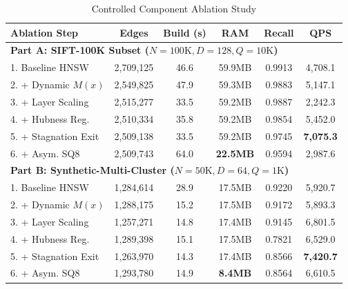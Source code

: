 \documentclass[conference,10pt]{IEEEtran}
\begin{document}
\begin{table}[htbp]
\caption{Controlled Component Ablation Study}
\centering
\begin{tabular}{lccccc}
\toprule
\textbf{Ablation Step} & \textbf{Edges} & \textbf{Build (s)} & \textbf{RAM} & \textbf{Recall} & \textbf{QPS} \\
\midrule
\multicolumn{6}{l}{\textbf{Part A: SIFT-100K Subset ($N=100\text{K}, D=128, Q=10\text{K}$)}} \\
1. Baseline HNSW & 2,709,125 & 46.6 & 59.9MB & 0.9913 & 4,708.1 \\
2. + Dynamic $M(x)$ & 2,549,825 & 47.9 & 59.3MB & 0.9883 & 5,147.1 \\
3. + Layer Scaling & 2,515,277 & 33.5 & 59.2MB & 0.9887 & 2,242.3 \\
4. + Hubness Reg. & 2,510,334 & 35.8 & 59.2MB & 0.9854 & 5,452.0 \\
5. + Stagnation Exit & 2,509,138 & 33.5 & 59.2MB & 0.9745 & \textbf{7,075.3} \\
6. + Asym. SQ8 & 2,509,743 & 64.0 & \textbf{22.5MB} & 0.9594 & 2,987.6 \\
\midrule
\multicolumn{6}{l}{\textbf{Part B: Synthetic-Multi-Cluster ($N=50\text{K}, D=64, Q=1\text{K}$)}} \\
1. Baseline HNSW & 1,284,614 & 28.9 & 17.5MB & 0.9220 & 5,920.7 \\
2. + Dynamic $M(x)$ & 1,288,175 & 15.2 & 17.5MB & 0.9172 & 5,893.3 \\
3. + Layer Scaling & 1,257,271 & 14.8 & 17.4MB & 0.9145 & 6,801.5 \\
4. + Hubness Reg. & 1,289,398 & 15.1 & 17.5MB & 0.7821 & 6,529.0 \\
5. + Stagnation Exit & 1,263,970 & 14.3 & 17.4MB & 0.8566 & \textbf{7,420.7} \\
6. + Asym. SQ8 & 1,293,780 & 14.9 & \textbf{8.4MB} & 0.8564 & 6,610.5 \\
\bottomrule
\end{tabular}
\end{table}
\end{document}
